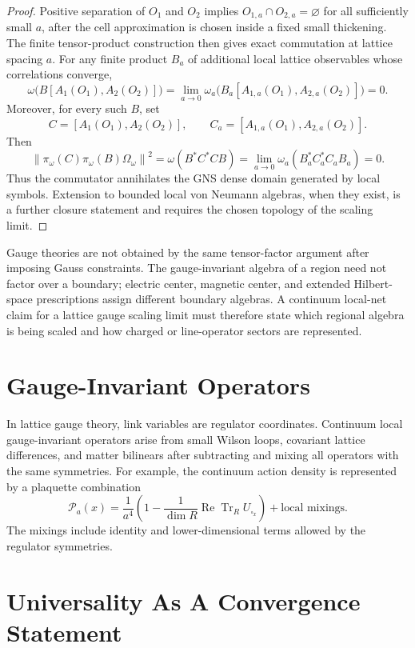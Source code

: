 \begin{proof}
Positive separation of \(O_1\) and \(O_2\) implies
\(O_{1,a}\cap O_{2,a}=\varnothing\) for all sufficiently small \(a\), after
the cell approximation is chosen inside a fixed small thickening.  The finite
tensor-product construction then gives exact commutation at lattice spacing
\(a\).  For any finite product \(B_a\) of additional local lattice
observables whose correlations converge,
\[
  \omega\bigl(B[A_1(O_1),A_2(O_2)]\bigr)
  =
  \lim_{a\to0}\omega_a\bigl(B_a[A_{1,a}(O_1),A_{2,a}(O_2)]\bigr)
  =
  0 .
  \]
Moreover, for every such \(B\), set
\[
  C=[A_1(O_1),A_2(O_2)],
  \qquad
  C_a=[A_{1,a}(O_1),A_{2,a}(O_2)] .
\]
Then
\[
  \left\|\pi_\omega(C)\pi_\omega(B)\Omega_\omega\right\|^2
  =
  \omega(B^*C^*CB)
  =
  \lim_{a\to0}\omega_a(B_a^*C_a^*C_aB_a)
  =
  0 .
  \]
Thus the commutator annihilates the GNS dense domain generated by local
symbols.  Extension to bounded local von Neumann algebras, when they exist,
is a further closure statement and requires the chosen topology of the
scaling limit.
\end{proof}

Gauge theories are not obtained by the same tensor-factor argument after
imposing Gauss constraints.  The gauge-invariant algebra of a region need not
factor over a boundary; electric center, magnetic center, and extended
Hilbert-space prescriptions assign different boundary algebras.  A continuum
local-net claim for a lattice gauge scaling limit must therefore state which
regional algebra is being scaled and how charged or line-operator sectors are
represented.

\section{Gauge-Invariant Operators}

In lattice gauge theory, link variables are regulator coordinates.  Continuum
local gauge-invariant operators arise from small Wilson loops, covariant
lattice differences, and matter bilinears after subtracting and mixing all
operators with the same symmetries.  For example, the continuum action
density is represented by a plaquette combination
\[
  \mathcal P_a(x)
  =
  \frac{1}{a^4}\left(1-\frac{1}{\dim R}\operatorname{Re}\operatorname{Tr}_R
  U_{\square_x}\right)
  +\text{local mixings}.
\]
The mixings include identity and lower-dimensional terms allowed by the
regulator symmetries.

\section{Universality As A Convergence Statement}

